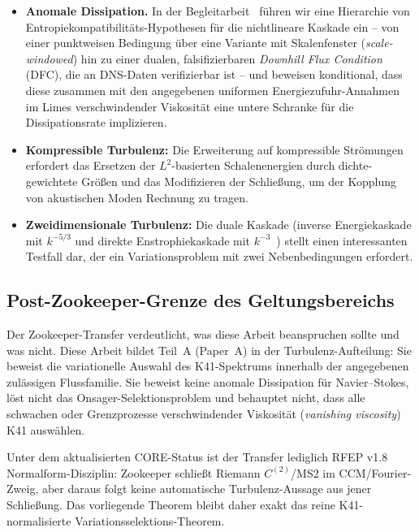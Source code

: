 \documentclass[12pt,a4paper]{article}
\theoremstyle{definition}
\theoremstyle{plain}
\theoremstyle{remark}
\begin{document}
\begin{itemize}
  \item \textbf{Anomale Dissipation.}\;
    In der Begleitarbeit~\cite{Geiger2026b} führen wir eine Hierarchie von
    Entropiekompatibilitäts-Hypothesen für die nichtlineare Kaskade ein -- von einer punktweisen Bedingung über eine Variante mit Skalenfenster (\emph{scale-windowed}) hin zu einer dualen, falsifizierbaren
    \emph{Downhill Flux Condition} (DFC), die an DNS-Daten verifizierbar ist -- und
    beweisen konditional, dass diese zusammen mit den angegebenen uniformen
    Energiezufuhr-Annahmen im Limes verschwindender Viskosität eine untere
    Schranke für die Dissipationsrate implizieren.
  \item \textbf{Kompressible Turbulenz:}
    Die Erweiterung auf kompressible Strömungen erfordert das Ersetzen der
    $L^2$-basierten Schalenenergien durch dichte-gewichtete Größen und das Modifizieren der
    Schließung, um der Kopplung von akustischen Moden Rechnung zu tragen.
  \item \textbf{Zweidimensionale Turbulenz:}
    Die duale Kaskade (inverse Energiekaskade mit $k^{-5/3}$ und direkte
    Enstrophiekaskade mit $k^{-3}$~\cite{Kraichnan67}) stellt einen
    interessanten Testfall dar, der ein Variationsproblem mit zwei Nebenbedingungen erfordert.
\end{itemize}

\subsection{Post-Zookeeper-Grenze des Geltungsbereichs}
\label{subsec:zookeeper-k41-scope}

Der Zookeeper-Transfer verdeutlicht, was diese Arbeit beanspruchen sollte und was nicht. Diese Arbeit bildet Teil~A (Paper~A) in der Turbulenz-Aufteilung: Sie beweist die variationelle Auswahl des K41-Spektrums innerhalb der angegebenen zulässigen Flussfamilie. Sie beweist keine anomale Dissipation für Navier--Stokes, löst nicht das Onsager-Selektionsproblem und behauptet nicht, dass alle schwachen oder Grenzprozesse verschwindender Viskosität (\emph{vanishing viscosity}) K41 auswählen.

Unter dem aktualisierten CORE-Status ist der Transfer lediglich RFEP v1.8
Normalform-Disziplin: Zookeeper schließt Riemann $C^{(2)}$/MS2 im
CCM/Fourier-Zweig, aber daraus folgt keine automatische Turbulenz-Aussage aus
jener Schließung. Das vorliegende Theorem bleibt daher exakt das reine
K41-normalisierte Variationsselektions-Theorem.
\end{document}
